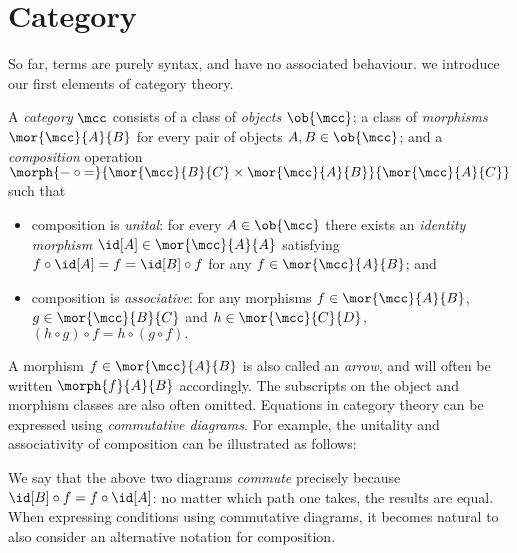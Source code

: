 \section{Category}

So far, terms are purely syntax, and have no associated behaviour.
 we introduce our first elements of category theory.

\begin{definition}[Category]
    \label{def:category}
    A \emph{category} \(\mcc\) consists of a class of \emph{objects}
    \(\ob{\mcc}\); a class of \emph{morphisms} \(\mor{\mcc}{A}{B}\)
    for every pair of objects \(A, B \in \ob{\mcc}\); and a \emph{composition}
    operation \(
        \morph{
            {-} \circ {=}
        }{
            \mor{\mcc}{B}{C} \times \mor{\mcc}{A}{B}
        }{
            \mor{\mcc}{A}{C}
        }
    \) such that
    \begin{itemize}
        \item composition is \emph{unital}: for every \(
                    A \in \ob{\mcc}
                \) there exists an \emph{identity morphism} \(
                    \id[A] \in \mor{\mcc}{A}{A}
                \) satisfying \(
                    f \circ \id[A] = f = \id[B] \circ f
                \) for any \(
                    f \in \mor{\mcc}{A}{B}
                \); and
        \item composition is \emph{associative}: for any morphisms \(
                    f \in \mor{\mcc}{A}{B}
                \), \(
                    g \in \mor{\mcc}{B}{C}
                \) and \(h \in \mor{\mcc}{C}{D}\), \(
                    (h \circ g) \circ f = h \circ (g \circ f).
                \)
    \end{itemize}
\end{definition}

A morphism \(f \in \mor{\mcc}{A}{B}\) is also called an \emph{arrow}, and will
often be written \(\morph{f}{A}{B}\) accordingly.
The subscripts on the object and morphism classes are also often omitted.
Equations in category theory can be expressed using \emph{commutative diagrams}.
For example, the unitality and associativity of composition can be illustrated
as follows:

\begin{center}
    
    \quad
    
\end{center}

We say that the above two diagrams \emph{commute} precisely because \(
    \id[B] \circ f = f \circ \id[A]
\): no matter which path one takes, the results are equal.
When expressing conditions using commutative diagrams, it becomes natural to
also consider an alternative notation for composition.

